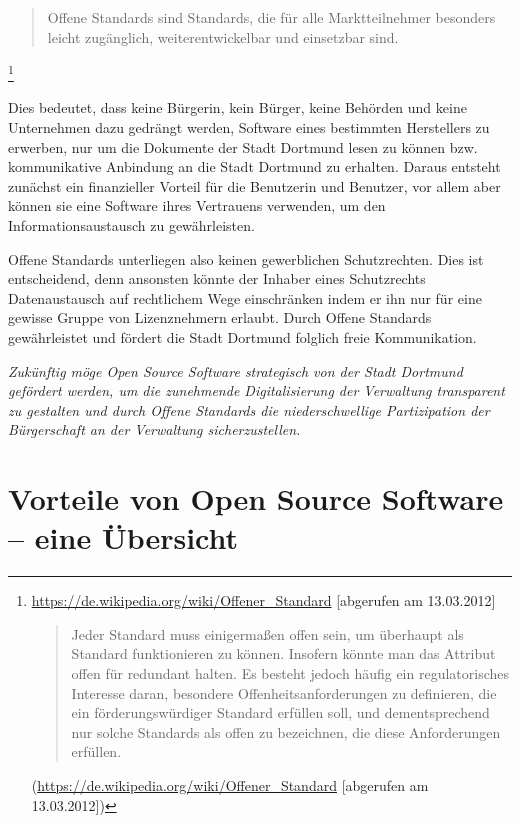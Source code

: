 \documentclass[a4paper]{scrartcl}
\begin{document}
\begin{quote}Offene Standards sind Standards, die für alle Marktteilnehmer besonders
  leicht zugänglich, weiterentwickelbar und einsetzbar
  sind.\end{quote}\footnote{\url{https://de.wikipedia.org/wiki/Offener_Standard}
  [abgerufen am 13.03.2012]

  \begin{quote}Jeder Standard muss einigermaßen offen sein, um überhaupt als Standard
    funktionieren zu können. Insofern könnte man das Attribut offen für
    redundant halten. Es besteht jedoch häufig ein regulatorisches Interesse
    daran, besondere Offenheitsanforderungen zu definieren, die ein
    förderungswürdiger Standard erfüllen soll, und dementsprechend nur solche
    Standards als offen zu bezeichnen, die diese Anforderungen erfüllen.\end{quote}
  (\url{https://de.wikipedia.org/wiki/Offener_Standard} [abgerufen am
  13.03.2012])}

Dies bedeutet, dass keine Bürgerin, kein Bürger, keine Behörden und keine
Unternehmen dazu gedrängt werden, Software eines bestimmten Herstellers zu
erwerben, nur um die Dokumente der Stadt Dortmund lesen zu können
bzw. kommunikative Anbindung an die Stadt Dortmund zu erhalten. Daraus entsteht
zunächst ein finanzieller Vorteil für die Benutzerin und Benutzer, vor allem
aber können sie eine Software ihres Vertrauens verwenden, um den
Informationsaustausch zu gewährleisten.

Offene Standards unterliegen also keinen gewerblichen Schutzrechten. Dies ist
entscheidend, denn ansonsten könnte der Inhaber eines Schutzrechts
Datenaustausch auf rechtlichem Wege einschränken indem er ihn nur für eine
gewisse Gruppe von Lizenznehmern erlaubt. Durch Offene Standards gewährleistet
und fördert die Stadt Dortmund folglich freie Kommunikation.

\emph{Zukünftig möge Open Source Software strategisch von der Stadt Dortmund gefördert
werden, um die zunehmende Digitalisierung der Verwaltung transparent zu
gestalten und durch Offene Standards die niederschwellige Partizipation der
Bürgerschaft an der Verwaltung sicherzustellen.}

\section{Vorteile von Open Source Software -- eine Übersicht}
\end{document}
